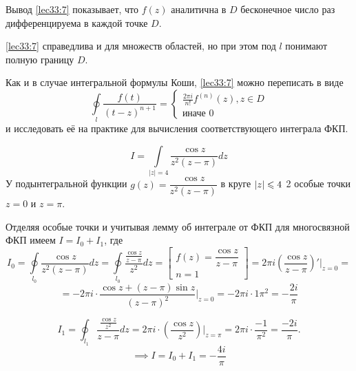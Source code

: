 \documentclass[../../main.tex]{subfiles}
\begin{document}
\begin{rems}
	\item Вывод \eqref{lec33:7} показывает, что $f(z)$ аналитична в 
	$D$ бесконечное число раз дифференцируема в каждой точке
	$D$.
	\item \eqref{lec33:7} справедлива и для множеств
	областей, но при этом под $l$ понимают полную границу $D$.
	
	\item Как и в случае интегральной формулы Коши, 
	\eqref{lec33:7} можно переписать в виде 
	\[
	\oint\limits_l \frac{f(t)}{(t-z)^{n+1}} = 
	\begin{cases}
	\frac{2\pi i}{n!} f^{(n)}(z), z \in D \\
	\text{иначе 0}
	\end{cases}
	\]
	и исследовать её на практике для вычисления
	соответствующего интеграла ФКП.
\end{rems}
\begin{exmp}
	\[
	I = \int\limits_{|z|=4}\frac{\cos z}{z^2 (z-\pi)}
	dz
	\]
	У подынтегральной функции $g(z)=\dfrac{\cos z}
	{z^2(z-\pi)}$ в круге $\left|{z}\right| \leqslant 4$
	2 особые точки $z=0$ и $z=\pi$.
	
	
	Отделяя особые точки и учитывая лемму об 
	интеграле от ФКП для многосвязной ФКП имеем 
	$I = I_0 + I_1$, где 
	\[
	I_0 = 
	\oint\limits_{l_0}\dfrac{\cos z}{z^2(z - \pi)} 
	dz=
	\oint\limits_{l_0}\dfrac{\frac{\cos z}
		{z-\pi}}{z^2} dz
	= \left[
	\begin{array}{l}
	f(z) = \dfrac{\cos z}{z-\pi} \\
	n = 1
	\end{array}
	\right] = 
	2\pi i \left( \dfrac{\cos z}{z-\pi}\right)'
	|_{z=0}=
	\]
	\[= -2\pi i \cdot \dfrac{\cos z + 
		(z - \pi) \sin z}{(z-\pi)^2}|_{z=0}=
	-2\pi i \cdot {1}{\pi ^2} = -\dfrac{2i}{\pi}
	\]
	
	\[
	I_1 = \oint_{l_1} \dfrac{\frac{\cos z}{z^2}}
	{z-\pi} dz = 2 \pi i \cdot \left(
	\dfrac{\cos z}{z^2}
	\right) |_{z=\pi} = 2\pi i \cdot \dfrac{-1}{\pi^2}
	=\dfrac{-2i}{\pi}.
	\]
	\[
	\implies I = I_0 + I_1 = -\dfrac{4i}{\pi}
	\]
\end{exmp}
\end{document}
